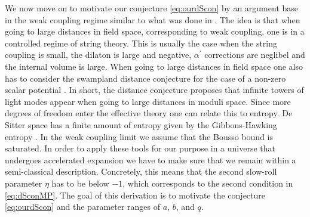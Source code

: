 \documentclass[12pt]{report}
\begin{document}
We now move on to motivate our conjecture \eqref{eq:ourdScon} by an argument base in the weak coupling regime similar to what was done in \cite{Ooguri:2018wrx}. The idea is that when going to large distances in field space, corresponding to weak coupling, one is in a controlled regime of string theory. This is usually the case when the string coupling is small, the dilaton is large and negative, $\alpha^ \prime$ corrections are neglibel and the internal volume is large. When going to large distances in field space one also has to consider the swampland distance conjecture \cite{Baume:2016psm} for the case of a non-zero scalar potential \cite{Klaewer:2016kiy,Ooguri:2006in}. In short, the distance conjecture proposes that infinite towers of light modes appear when going to large distances in moduli space. Since more degrees of freedom enter the effective theory one can relate this to entropy. De Sitter space has a finite amount of entropy given by the Gibbons-Hawking entropy \cite{Gibbons:1977mu}. In the weak coupling limit we assume that the Bousso bound \cite{Bousso:1999xy} is saturated. In order to apply these tools for our purpose in a universe that undergoes accelerated expansion we have to make sure that we remain within a semi-classical description. Concretely, this means that the second slow-roll parameter $\eta$ has to be below $-1$, which corresponds to the second condition in \eqref{eq:dSconMP}. The goal of this derivation is to motivate the conjecture \eqref{eq:ourdScon} and the parameter ranges of $a$, $b$, and $q$.
\end{document}
